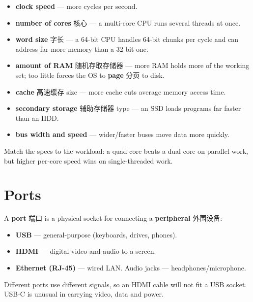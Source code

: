 \documentclass[11pt]{article}
\begin{document}
\begin{itemize}
\item \textbf{clock speed} — more cycles per second.

\item \textbf{number of cores} 核心 — a multi-core CPU runs several threads at once.

\item \textbf{word size} 字长 — a 64-bit CPU handles 64-bit chunks per cycle and can address far more memory than a 32-bit one.

\item \textbf{amount of RAM} 随机存取存储器 — more RAM holds more of the working set; too little forces the OS to \textbf{page} 分页 to disk.

\item \textbf{cache} 高速缓存 size — more cache cuts average memory access time.

\item \textbf{secondary storage} 辅助存储器 type — an SSD loads programs far faster than an HDD.

\item \textbf{bus width and speed} — wider/faster buses move data more quickly.

\end{itemize}

Match the specs to the workload: a quad-core beats a dual-core on parallel work, but higher per-core speed wins on single-threaded work.

\section*{Ports}

A \textbf{port} 端口 is a physical socket for connecting a \textbf{peripheral} 外围设备:

\begin{itemize}
\item \textbf{USB} — general-purpose (keyboards, drives, phones).

\item \textbf{HDMI} — digital video and audio to a screen.

\item \textbf{Ethernet (RJ-45)} — wired LAN. Audio jacks — headphones/microphone.

\end{itemize}

Different ports use different signals, so an HDMI cable will not fit a USB socket. USB-C is unusual in carrying video, data and power.
\end{document}
